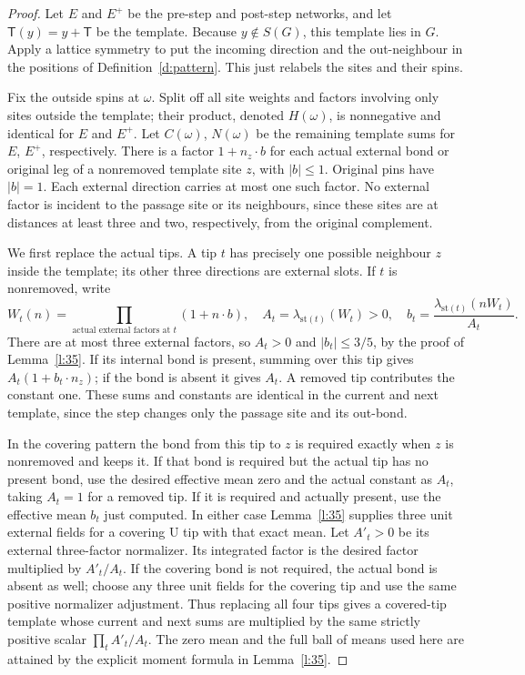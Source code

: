 \begin{proof}
Let \(E\) and \(E^+\) be the pre-step and post-step networks,
and let \(\mathsf T(y)=y+\mathsf T\) be the template.
Because \(y\notin S(G)\), this template lies in \(G\).
Apply a lattice symmetry to put the incoming direction and the
out-neighbour in the positions of Definition~\ref{d:pattern}.
This just relabels the sites and their spins.

Fix the outside spins at \(\omega\). Split off all site weights
and factors involving only sites outside the template; their
product, denoted \(H(\omega)\), is nonnegative and identical
for \(E\) and \(E^+\). Let \(C(\omega)\), \(N(\omega)\) be the
remaining template sums for \(E\), \(E^+\), respectively.
There is a factor \(1+n_z\cdot b\) for each actual external
bond or original leg of a nonremoved template site \(z\), with
\(|b|\le1\). Original pins have \(|b|=1\).
Each external direction carries at most one such factor.
No external factor is incident to the passage site or its
neighbours, since these sites are at distances at least three
and two, respectively, from the original complement.

We first replace the actual tips. A tip \(t\) has precisely one
possible neighbour \(z\) inside the template; its other three
directions are external slots. If \(t\) is nonremoved, write
\[
 W_t(n)=\prod_{\text{actual external factors at }t}(1+n\cdot b),
 \quad A_t=\lambda_{\mathrm{st}(t)}(W_t)>0,\quad
 b_t=\frac{\lambda_{\mathrm{st}(t)}(nW_t)}{A_t}.
\]
There are at most three external factors, so \(A_t>0\) and
\(|b_t|\le3/5\), by the proof of Lemma~\ref{l:35}.
If its internal bond is present, summing over this tip gives
\(A_t(1+b_t\cdot n_z)\); if the bond is absent it gives \(A_t\).
A removed tip contributes the constant one.
These sums and constants are identical in the current and next
template, since the step changes only the passage site and its
out-bond.

In the covering pattern the bond from this tip to \(z\) is
required exactly when \(z\) is nonremoved and keeps it.
If that bond is required but the actual tip has no present bond,
use the desired effective mean zero and the actual constant
as \(A_t\), taking \(A_t=1\) for a removed tip.
If it is required and actually present, use the effective mean
\(b_t\) just computed. In either case Lemma~\ref{l:35}
supplies three unit external fields for a covering
\(\mathrm U\) tip with that exact mean. Let \(A'_t>0\) be
its external three-factor normalizer. Its integrated factor
is the desired factor multiplied by \(A'_t/A_t\).
If the covering bond is not required, the actual bond is
absent as well; choose any three unit fields for the covering
tip and use the same positive normalizer adjustment.
Thus replacing all four tips gives a covered-tip template whose
current and next sums are multiplied by the same strictly
positive scalar \(\prod_t A'_t/A_t\).
The zero mean and the full ball of means used here are attained
by the explicit moment formula in Lemma~\ref{l:35}.


\end{proof}
